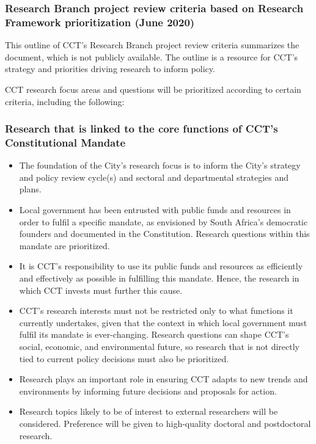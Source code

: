 \documentclass[
]{book}
\providecommand{\tightlist}{%
  \setlength{\itemsep}{0pt}\setlength{\parskip}{0pt}}
\begin{document}
\hypertarget{research-branch-project-review-criteria-based-on-research-framework-prioritization-june-2020}{%
\subsubsection*{Research Branch project review criteria based on Research Framework prioritization (June 2020)}\label{research-branch-project-review-criteria-based-on-research-framework-prioritization-june-2020}}

This outline of CCT's Research Branch project review criteria summarizes the document, which is not publicly available. The outline is a resource for CCT's strategy and priorities driving research to inform policy.

CCT research focus areas and questions will be prioritized according to certain criteria, including the following:

\hypertarget{research-that-is-linked-to-the-core-functions-of-ccts-constitutional-mandate}{%
\subsubsection*{Research that is linked to the core functions of CCT's Constitutional Mandate}\label{research-that-is-linked-to-the-core-functions-of-ccts-constitutional-mandate}}

\begin{itemize}
\tightlist
\item
  The foundation of the City's research focus is to inform the City's strategy and policy review cycle(s) and sectoral and departmental strategies and plans.
\item
  Local government has been entrusted with public funds and resources in order to fulfil a specific mandate, as envisioned by South Africa's democratic founders and documented in the Constitution. Research questions within this mandate are prioritized.
\item
  It is CCT's responsibility to use its public funds and resources as efficiently and effectively as possible in fulfilling this mandate. Hence, the research in which CCT invests must further this cause.
\item
  CCT's research interests must not be restricted only to what functions it currently undertakes, given that the context in which local government must fulfil its mandate is ever-changing. Research questions can shape CCT's social, economic, and environmental future, so research that is not directly tied to current policy decisions must also be prioritized.
\item
  Research plays an important role in ensuring CCT adapts to new trends and environments by informing future decisions and proposals for action.
\item
  Research topics likely to be of interest to external researchers will be considered. Preference will be given to high-quality doctoral and postdoctoral research.
\end{itemize}
\end{document}
